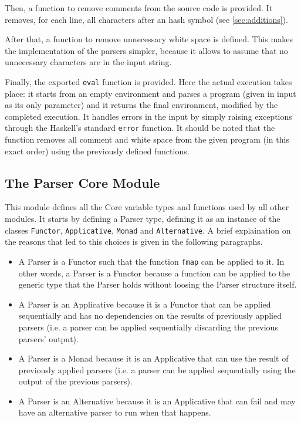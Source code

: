 \documentclass{esposito-documentation}
\begin{document}


Then, a function to remove comments from the source code is provided. It
removes, for each line, all characters after an hash symbol (see
\autoref{sec:additions}).



After that, a function to remove unnecessary white space is defined. This makes
the implementation of the parsers simpler, because it allows to assume that no
unnecessary characters are in the input string.



Finally, the exported \lstinline|eval| function is provided. Here the actual
execution takes place: it starts from an empty environment and parses a program
(given in input as its only parameter) and it returns the final environment,
modified by the completed execution. It handles errors in the input by simply
raising exceptions through the Haskell's standard \lstinline|error| function.
It should be noted that the function removes all comment and white space from
the given program (in this exact order) using the previously defined functions.



\subsection{The Parser Core Module}


This module defines all the Core variable types and functions used by all other
modules. It starts by defining a Parser type, defining it as an instance of the
classes \lstinline|Functor|, \lstinline|Applicative|, \lstinline|Monad| and
\lstinline|Alternative|. A brief explaination on the reasons that led to this
choices is given in the following paragraphs.

\begin{itemize}
	\item A Parser is a Functor such that the function \lstinline|fmap| can be
		applied to it. In other words, a Parser is a Functor because a function
		can be applied to the generic type that the Parser holds without
		loosing the Parser structure itself.
	\item A Parser is an Applicative because it is a Functor that can be
		applied sequentially and has no dependencies on the results of
		previously applied parsers (i.e. a parser can be applied sequentially
		discarding the previous parsers' output).
	\item A Parser is a Monad because it is an Applicative that can use the
		result of previously applied parsers (i.e. a parser can be applied
		sequentially using the output of the previous parsers).
	\item A Parser is an Alternative because it is an Applicative that can fail
		and may have an alternative parser to run when that happens.
\end{itemize}
\end{document}
